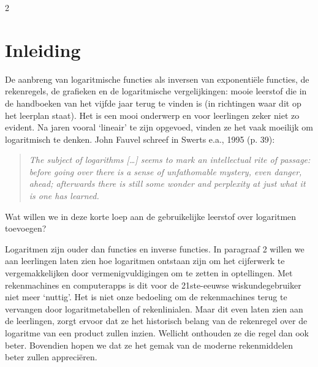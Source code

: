 \begin{multicols}{2}                      
\inhoudstafelLoep		                  %


\vspace{1,5cm}
\section{Inleiding}
De aanbreng van logaritmische functies als inversen van exponentiële functies, de rekenregels, de grafieken en de logaritmische vergelijkingen: mooie leerstof die in de handboeken van het vijfde jaar terug te vinden is (in richtingen waar dit op het leerplan staat). Het is een mooi onderwerp en voor leerlingen zeker niet zo evident. Na jaren vooral `lineair' te zijn opgevoed, vinden ze het vaak moeilijk om logaritmisch te denken. John Fauvel schreef in Swerts e.a., 1995 (p. 39):
\begin{quote}
    \emph{The subject of logarithms […] seems to mark an intellectual rite of passage: before going over there is a sense of unfathomable mystery, even danger, ahead; afterwards there is still some wonder and perplexity at just what it is one has learned.}
\end{quote}

Wat willen we in deze korte loep aan de gebruikelijke leerstof over logaritmen toevoegen?

Logaritmen zijn ouder dan functies en inverse functies. In paragraaf 2 willen we aan leerlingen laten zien hoe logaritmen ontstaan zijn om het cijferwerk te vergemakkelijken door vermenigvuldigingen om te zetten in optellingen. Met rekenmachines en computerapps is dit voor de 21ste-eeuwse wiskundegebruiker niet meer `nuttig’. Het is niet onze bedoeling om de rekenmachines terug te vervangen door logaritmetabellen of rekenlinialen. Maar dit even laten zien aan de leerlingen, zorgt ervoor dat ze het historisch belang van de rekenregel over de logaritme van een product zullen inzien. Wellicht onthouden ze die regel dan ook beter. Bovendien hopen we dat ze het gemak van de moderne rekenmiddelen beter zullen appreciëren. 


\end{multicols}
